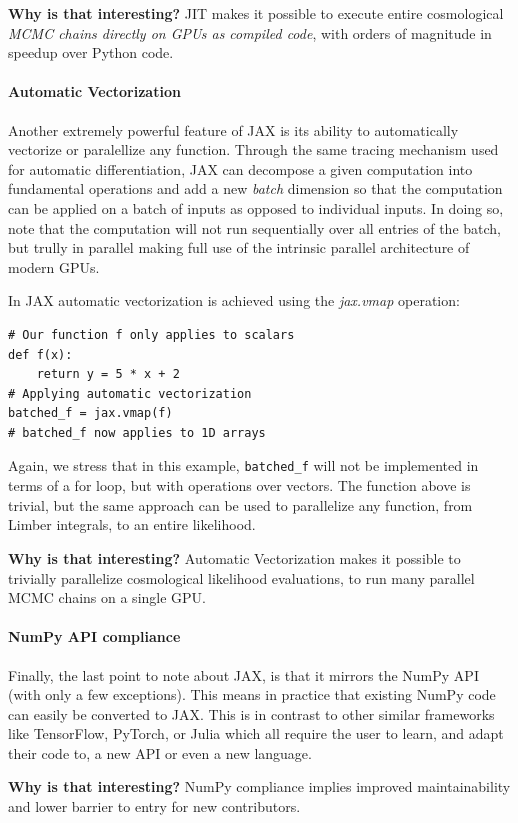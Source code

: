 \documentclass[twocolumn,twocolappendix,nofootinbib,iop]{openjournal}
\begin{document}
\textbf{Why is that interesting?} JIT makes it possible to execute entire cosmological \textit{MCMC chains directly on GPUs as compiled code}, with orders of magnitude in speedup over Python code.

\paragraph{Automatic Vectorization} Another extremely powerful feature of JAX is its ability to automatically vectorize or paralellize any function. Through the same tracing mechanism used for automatic differentiation, JAX can decompose a given computation into fundamental operations and add a new \textit{batch} dimension so that the computation can be applied on a batch of inputs as opposed to individual inputs. In doing so, note that the computation will not run sequentially over all entries of the batch, but trully in parallel making full use of the intrinsic parallel architecture of modern GPUs.

In JAX automatic vectorization is achieved using the \textit{jax.vmap} operation:
\begin{lstlisting}[language=iPython]
# Our function f only applies to scalars
def f(x):
	return y = 5 * x + 2
# Applying automatic vectorization
batched_f = jax.vmap(f)
# batched_f now applies to 1D arrays
\end{lstlisting}
Again, we stress that in this example, \texttt{batched\_f} will not be implemented in terms of a for loop, but with operations over vectors. The function above is trivial, but the same approach can be used to parallelize any function, from Limber integrals, to an entire likelihood.

\textbf{Why is that interesting?} Automatic Vectorization makes it possible to trivially parallelize cosmological likelihood evaluations, to run many parallel MCMC chains on a single GPU.

\paragraph{NumPy API compliance} Finally, the last point to note about JAX, is that it mirrors the NumPy API (with only a few exceptions). This means in practice that existing NumPy code can easily be converted to JAX. This is in contrast to other similar frameworks like TensorFlow, PyTorch, or Julia which all require the user to learn, and adapt their code to, a new API or even a new language. 

\textbf{Why is that interesting?} NumPy compliance implies improved maintainability and lower barrier to entry for new contributors.
\end{document}
